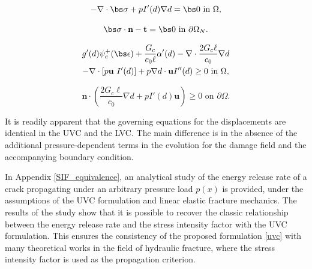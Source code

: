 \begin{mdframed}[
    frametitle={\begin{equation}\label{lvc}\tag{LVC}\text{Loaded Virtual Crack Formulation}\end{equation}},
    frametitlebackgroundcolor=gray!20,
    backgroundcolor=gray!5,
    linewidth=0pt,
    nobreak=true
  ]
  
\begin{equation}\label{disp equation box2}
    -\nabla \cdot \bs\sigma  + pI'(d) \nabla d = \bs 0 \text{ in }\Omega,
\end{equation}

\begin{equation}\label{disp bcs box2}
    \bs\sigma\cdot \textbf{n} - \textbf{t} = \bs 0 \text{ in }\partial\Omega_N.
\end{equation}

\begin{multline}\label{wet damage equation box2}
    g'(d) \psi_e^+(\bs\epsilon)
    + \dfrac{G_c}{c_0\ell}\alpha'(d) - \nabla \cdot \dfrac{2G_c\ell}{c_0}\nabla d \\ - \nabla \cdot [p\textbf{u}\ I'(d)] + p\nabla d\cdot \textbf{u}I''(d) \ge 0 \text{ in }\Omega,
\end{multline}
    
\begin{equation}\label{wet damage bcs box2}
    \textbf{n}\cdot \left(\dfrac{2G_c\ell}{c_0}\nabla d+   pI'(d)\textbf{u}\right) \ge 0 \text{ on }\partial\Omega.
\end{equation}
  
\end{mdframed}

\noindent It is readily apparent that the governing equations for the displacements are identical in the UVC and the LVC. The main difference is in the absence of the additional pressure-dependent terms in the evolution for the damage field and the accompanying boundary condition.  

In Appendix \ref{SIF_equivalence}, an analytical study of the energy release rate of a crack propagating under an arbitrary pressure load $p(x)$ is provided, under the assumptions of the UVC formulation and linear elastic fracture mechanics. The results of the study show that it is possible to recover the classic relationship between the energy release rate and the stress intensity factor with the UVC formulation. This ensures the consistency of the proposed formulation \eqref{uvc} with many theoretical works \cite{detournay2016mechanics, garagash2000tip, detournay2004propagation, garagash2005plane, bunger2005toughness} in the field of hydraulic fracture, where the stress intensity factor is used as the propagation criterion.

